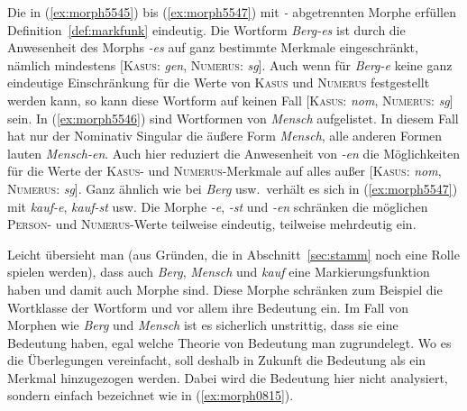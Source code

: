 \begin{exe}
  \ex \label{ex:morph5545}
  \begin{xlist}
  \end{xlist}
  \ex \label{ex:morph5546}
  \begin{xlist}
  \end{xlist}
  \ex \label{ex:morph5547}
  \begin{xlist}
  \end{xlist}
\end{exe}

Die in (\ref{ex:morph5545}) bis (\ref{ex:morph5547}) mit \textit{-} abgetrennten Morphe erfüllen Definition~\ref{def:markfunk} eindeutig.
Die Wortform \textit{Berg-es} ist durch die Anwesenheit des Morphs \textit{-es} auf ganz bestimmte Merkmale eingeschränkt, nämlich mindestens [\textsc{Kasus}: \textit{gen}, \textsc{Numerus}: \textit{sg}].
\label{abs:4578239547}Auch wenn für \textit{Berg-e} keine ganz eindeutige Einschränkung für die Werte von \textsc{Kasus} und \textsc{Numerus} festgestellt werden kann, so kann diese Wortform \zB auf keinen Fall [\textsc{Kasus}: \textit{nom}, \textsc{Numerus}: \textit{sg}] sein.
In (\ref{ex:morph5546}) sind Wortformen von \textit{Mensch} aufgelistet.
In diesem Fall hat nur der Nominativ Singular die äußere Form \textit{Mensch}, alle anderen Formen lauten \textit{Mensch-en}.
Auch hier reduziert die Anwesenheit von \textit{-en} die Möglichkeiten für die Werte der \textsc{Kasus}- und \textsc{Numerus}-Merkmale auf alles außer [\textsc{Kasus}: \textit{nom}, \textsc{Numerus}: \textit{sg}].
Ganz ähnlich wie bei \textit{Berg} usw.\ verhält es sich in (\ref{ex:morph5547}) mit \textit{kauf-e}, \textit{kauf-st} usw.
Die Morphe \textit{-e}, \textit{-st} und \textit{-en} schränken die möglichen \textsc{Person}- und \textsc{Numerus}-Werte teilweise eindeutig, teilweise mehrdeutig ein.

Leicht übersieht man (aus Gründen, die in Abschnitt~\ref{sec:stamm} noch eine Rolle spielen werden), dass auch \textit{Berg}, \textit{Mensch} und \textit{kauf} eine Markierungsfunktion haben und damit auch Morphe sind.
Diese Morphe schränken zum Beispiel die Wortklasse der Wortform und vor allem ihre Bedeutung ein.
Im Fall von Morphen wie \textit{Berg} und \textit{Mensch} ist es sicherlich unstrittig, dass sie eine Bedeutung haben, egal welche Theorie von Bedeutung man zugrundelegt.
Wo es die Überlegungen vereinfacht, soll deshalb in Zukunft die Bedeutung als ein Merkmal hinzugezogen werden.
Dabei wird die Bedeutung hier nicht analysiert, sondern einfach bezeichnet wie in (\ref{ex:morph0815}).

